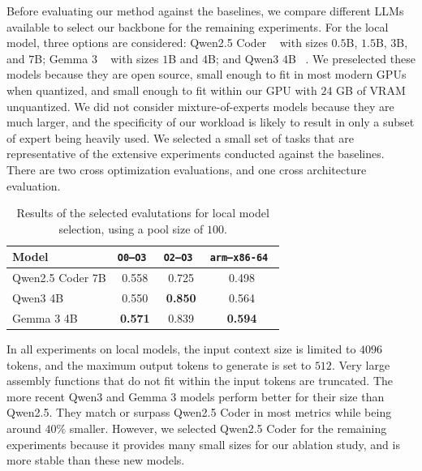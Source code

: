 Before evaluating our method against the baselines, we compare different LLMs available to select our backbone for the remaining experiments.
For the local model, three options are considered: Qwen2.5 Coder ~\cite{qwen2} with sizes \(0.5\)B, \(1.5\)B, \(3\)B, and \(7\)B;
Gemma 3 ~\cite{gemma3} with sizes \(1\)B and \(4\)B; and  Qwen3 \(4\)B ~\cite{qwen3}. We preselected these models because they are open source,
small enough to fit in most modern GPUs when quantized, and small enough to fit within our GPU with
\(24\) GB of VRAM unquantized. We did not consider mixture-of-experts models because they are much larger, and the specificity of our
workload is likely to result in only a subset of expert being heavily used. We selected a small set of tasks that are representative
of the extensive experiments conducted against the baselines. There are two cross optimization evaluations, and one cross architecture 
evaluation.
{
    \renewcommand{\arraystretch}{1.1}
    \begin{table}[h]
    \centering
    \begin{tabular}{|l|ccc|} \hline
    Model            & \tt O0--O3 & \tt O2--O3 & \tt arm--x86-64 \\ \hline
    Qwen2.5 Coder 7B & 0.558      & 0.725      & 0.498            \\
    Qwen3 4B         & 0.550      & \bf 0.850  & 0.564            \\
    Gemma 3 4B       & \bf 0.571  & 0.839      & \bf 0.594        \\ \hline
    \end{tabular}
    \caption{Results of the selected evalutations for local model selection, using a pool size of \(100\).}
    \end{table}
}

In all experiments on local models, the input context size is limited to \(4096\) tokens, and the maximum output tokens to generate is set to \(512\).
Very large assembly functions that do not fit within the input tokens are truncated. The more recent Qwen3 and Gemma 3
models perform better for their size than Qwen2.5. They match or surpass Qwen2.5 Coder in most metrics while being around \(40\%\)
smaller. However, we selected Qwen2.5 Coder for the remaining experiments because it provides many small sizes for our ablation study,
and is more stable than these new models.

